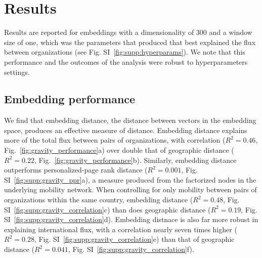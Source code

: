 \documentclass[12pt]{article} %
\begin{document}
\section{Results}\label{sec:results} %

Results are reported for embeddings with a dimensionality of 300 and a window size of one, which was the parameters that produced that best explained the flux between organizations (see Fig. SI~\ref{fig:supp:hyperparams}). 
We note that this performance and the outcomes of the analysis were robust to hyperparameters settings. 

%
%
\subsection*{Embedding performance}

We find that embedding distance, the distance between vectors in the embedding space, produces an effective measure of distance.
Embedding distance explains more of the total flux between pairs of organizations, with correlation ($R^{2} = 0.46$, Fig.~\ref{fig:gravity_performance}a) over double that of geographic distance ($R^{2} = 0.22$, Fig.~\ref{fig:gravity_performance}b).
Similarly, embedding distance outperforms personalized-page rank distance ($R^{2} = 0.001$, Fig. SI~\ref{fig:supp:gravity_ppr}a), a measure produced from the factorized nodes in the underlying mobility network. 
When controlling for only mobility between pairs of organizations within the same country, embedding distance ($R^{2} = 0.48$, Fig. SI~\ref{fig:supp:gravity_correlation}c) than does geographic distance ($R^{2} = 0.19$, Fig. SI~\ref{fig:supp:gravity_correlation}d). 
Embedding distnace is also far more robust in explaining international flux, with a correlation nearly seven times higher ($R^{2} = 0.28$, Fig. SI~\ref{fig:supp:gravity_correlation}e) than that of geographic distance ($R^{2} = 0.041$, Fig. SI~\ref{fig:supp:gravity_correlation}f). 
\end{document}
